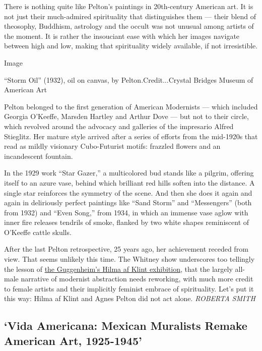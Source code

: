 There is nothing quite like Pelton's paintings in 20th-century American
art. It is not just their much-admired spirituality that distinguishes
them --- their blend of theosophy, Buddhism, astrology and the occult
was not unusual among artists of the moment. It is rather the insouciant
ease with which her images navigate between high and low, making that
spirituality widely available, if not irresistible.

Image

``Storm Oil'' (1932), oil on canvas, by Pelton.Credit...Crystal Bridges
Museum of American Art

Pelton belonged to the first generation of American Modernists --- which
included Georgia O'Keeffe, Marsden Hartley and Arthur Dove --- but not
to their circle, which revolved around the advocacy and galleries of the
impresario Alfred Stieglitz. Her mature style arrived after a series of
efforts from the mid-1920s that read as mildly visionary Cubo-Futurist
motifs: frazzled flowers and an incandescent fountain.

In the 1929 work ``Star Gazer,'' a multicolored bud stands like a
pilgrim, offering itself to an azure vase, behind which brilliant red
hills soften into the distance. A single star reinforces the symmetry of
the scene. And then she does it again and again in deliriously perfect
paintings like ``Sand Storm'' and ``Messengers'' (both from 1932) and
``Even Song,'' from 1934, in which an immense vase aglow with inner fire
releases tendrils of smoke, flanked by two white shapes reminiscent of
O'Keeffe cattle skulls.

After the last Pelton retrospective, 25 years ago, her achievement
receded from view. That seems unlikely this time. The Whitney show
underscores too tellingly the lesson of
\href{https://www.nytimes3xbfgragh.onion/2018/10/11/arts/design/hilma-af-klint-review-guggenheim.html}{the
Guggenheim's Hilma af Klint exhibition}, that the largely all-male
narrative of modernist abstraction needs reworking, with much more
credit to female artists and their implicitly feminist embrace of
spirituality. Let's put it this way: Hilma af Klint and Agnes Pelton did
not act alone. \emph{ROBERTA SMITH}

\hypertarget{vida-americana-mexican-muralists-remake-american-art-1925-1945}{%
\subsection{`Vida Americana: Mexican Muralists Remake American Art,
1925-1945'}\label{vida-americana-mexican-muralists-remake-american-art-1925-1945}}

